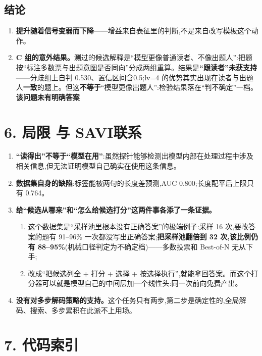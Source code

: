 \documentclass[fontset=none,10.5pt]{ctexart}
\begin{document}
\subsection*{结论}

\begin{enumerate}
\item \textbf{提升随着信号变弱而下降}——增益来自表征里的判断,不是来自改写模板这个动作。
\item \textbf{C 组的意外结果。}测过的候选解释是``模型更像普通读者、不像出题人'':把题按``标注多数票与出题意图是否同向''分成两组重算。结果是\textbf{``跟读者''未获支持}——分歧组上自判 0.530、置信区间含0.5;lv=4 的优势其实出现在读者与出题人\textbf{一致}的题上。但这\textbf{不等于}``模型更像出题人'':检验结果落在``判不确定''一档。\textbf{该问题未有明确答案}
\end{enumerate}

\section*{6. 局限 与 SAVI联系}

\begin{enumerate}
\item \textbf{``读得出''不等于``模型在用''}:虽然探针能够检测出模型内部在处理过程中涉及相关信息,但无法证明模型自己确实在使用这条信息。
\item \textbf{数据集自身的缺陷}:标签能被两句的长度差预测,AUC 0.800;长度配平后上限只有 0.764。
\item \textbf{给``候选从哪来''和``怎么给候选打分''这两件事各添了一条证据。}
  \begin{enumerate}[label=\roman*.]
  \item 这个数据集是``采样池里根本没有正确答案''的极端例子:采样 16 次,要改答案的题有 91--96\% 一次都没写出正确答案;\textbf{把采样池翻倍到 32 次,该比例仍有 88--95\%}(机械口径判定为不确定档)——多数投票和 Best-of-N 无从下手;
  \item 改成``把候选列全 + 打分 + 选择 + 按选择执行'',就能拿回答案。而这个打分器可以就是模型自己的中间层加一个线性头:同一次前向免费产出。
  \end{enumerate}
\item \textbf{没有对多步解码策略的支持。}这个任务只有两步,第二步是确定性的,全局解码、搜索、多步累积在此派不上用场。
\end{enumerate}

\section*{7. 代码索引}
\end{document}
